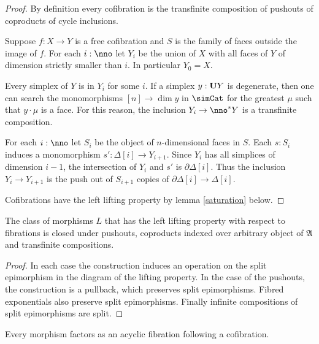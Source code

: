 \documentclass{tac}
\newcommand\ri{^*}
\newcommand\of{:}
\newcommand\simplex\Delta
\newcommand\cycle{\partial\Delta}
\newcommand\ambient{\mathfrak A}
\begin{document}
\begin{proof} By definition every cofibration is the transfinite composition of pushouts of coproducts of cycle inclusions.

Suppose $f\of X\to Y$ is a free cofibration and $S$ is the family of faces outside the image of $f$. For each $i\of\nno$ let $Y_i$ be the union of $X$ with all faces of $Y$ of dimension strictly smaller than $i$. In particular $Y_0=X$.

Every simplex of $Y$ is in $Y_i$ for some $i$. If a simplex $y\of\base Y$ is degenerate, then one can search the monomorphisms $[n]\to\dim y$ in $\simCat$ for the greatest $\mu$ such that $y\cdot\mu$ is a face. For this reason, the inclusion $Y_i\to\nno\ri Y$ is a transfinite composition.

For each $i\of\nno$ let $S_i$ be the object of $n$-dimensional faces in $S$. Each $s\of S_i$ induces a monomorphism $s'\of\simplex[i]\to Y_{i+1}$. Since $Y_{i}$ has all simplices of dimension $i-1$, the intersection of $Y_i$ and $s'$ is $\cycle[i]$. Thus the inclusion $Y_i\to Y_{i+1}$ is the push out of $S_{i+1}$ copies of $\cycle[i]\to\simplex[i]$. 

Cofibrations have the left lifting property by lemma \ref{saturation} below.
\end{proof}


\begin{lemma} The class of morphisms $L$ that has the left lifting property with respect to fibrations is closed under pushouts, coproducts indexed over arbitrary object of $\ambient$ and transfinite compositions. \label{saturation}
\end{lemma}

\begin{proof}
In each case the construction induces an operation on the split epimorphism in the diagram of the lifting property. 
In the case of the pushouts, the construction is a pullback, which preserves split epimorphisms.
Fibred exponentials also preserve split epimorphisms. Finally infinite compositions of split epimorphisms are split.
\end{proof}


\begin{proposition} Every morphism factors as an acyclic fibration following a cofibration. \label{factor1} \end{proposition}
\end{document}
